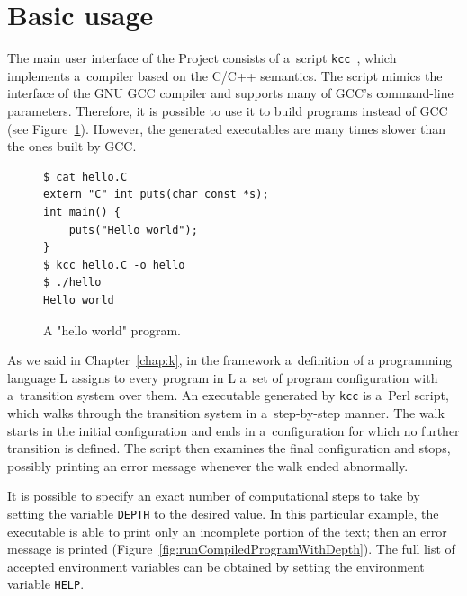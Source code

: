 \documentclass[nolot,nolof,nocover,printed]{fithesis3}
\newcommand{\kcc}{\texttt{kcc}\xspace}
\begin{document}

\section{Basic usage}

The main user interface of the Project consists of a~script \kcc~\cite{hathhorn-ellison-rosu-2015-pldi}, which implements a~compiler based on the C/C++ semantics. The script mimics the interface of the GNU GCC compiler and supports many of GCC's command-line parameters. Therefore, it is possible to use it to build programs instead of GCC (see Figure~\ref{helloWorldSource}). However, the generated executables are many times slower than the ones built by GCC.

\begin{figure}[ht]
\begin{lstlisting}
$ cat hello.C
extern "C" int puts(char const *s);
int main() {
	puts("Hello world");
}
$ kcc hello.C -o hello
$ ./hello
Hello world
\end{lstlisting}
\caption{A "hello world" program.}
\label{helloWorldSource}
\end{figure}

As we said in Chapter~\ref{chap:k}, in the \K framework a~definition of a programming language L assigns to every program in L a~set of program configuration with a~transition system over them. An executable generated by \kcc is a~Perl script, which walks through the transition system in a~step-by-step manner. The walk starts in the initial configuration and ends in a~configuration for which no further transition is defined. The script then examines the final configuration and stops, possibly printing an error message whenever the walk ended abnormally.

It is possible to specify an exact number of computational steps to take by setting the variable \texttt{DEPTH} to the desired value. In this particular example, the executable is able to print only an incomplete portion of the text; then an error message is printed (Figure~\ref{fig:runCompiledProgramWithDepth}). The full list of accepted environment variables can be obtained by setting the environment variable \texttt{HELP}.
\end{document}
